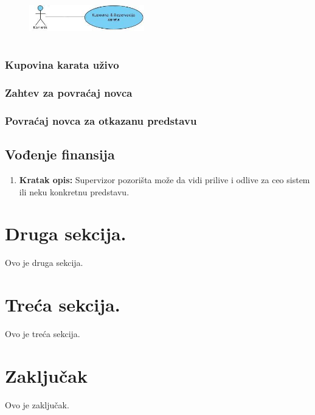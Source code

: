 \documentclass[a4paper]{article}
\begin{document}
\begin{figure}[H]
  \begin{center}
      \includegraphics[width=50mm,height=20mm]{../diagrams/usecase_prodaja_karata.jpg}
  \end{center}
\end{figure}

\subsubsection{Kupovina karata uživo}

\subsubsection{Zahtev za povraćaj novca}

\subsubsection{Povraćaj novca za otkazanu predstavu}

\subsection{Vođenje finansija}
\begin{enumerate}
  \item \textbf{Kratak opis:} Supervizor pozorišta može da vidi prilive i odlive za ceo sistem ili
        neku konkretnu predstavu. 
\end{enumerate}

\section{Druga sekcija.}
Ovo je druga sekcija.

\section{Treća sekcija.}
Ovo je treća sekcija.

\section{Zaključak}
Ovo je zaključak.

\newpage

\appendix
 

\end{document}
